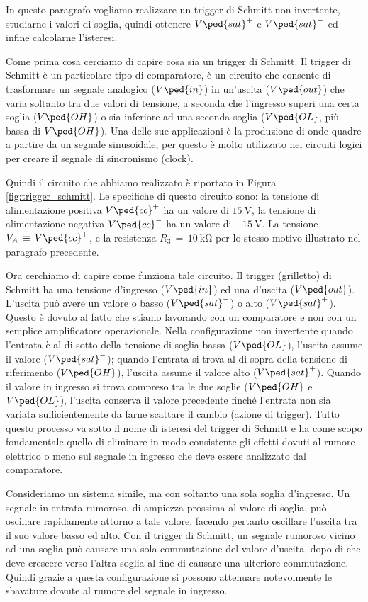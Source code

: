 In questo paragrafo vogliamo realizzare un trigger di Schmitt non invertente, studiarne i valori di soglia, quindi ottenere $V\ped{sat}^+$ e $V\ped{sat}^-$ ed infine calcolarne l'isteresi.

Come prima cosa cerciamo di capire cosa sia un trigger di Schmitt. Il trigger di Schmitt è un particolare tipo di comparatore, è un circuito che consente di trasformare un segnale analogico ($V\ped{in}$) in un'uscita ($V\ped{out}$) che varia soltanto tra due valori di tensione, a seconda che l'ingresso superi una certa soglia ($V\ped{OH}$) o sia inferiore ad una seconda soglia ($V\ped{OL}$, più bassa di $V\ped{OH}$). Una delle sue applicazioni è la produzione di onde quadre a partire da un segnale sinusoidale, per questo è molto utilizzato nei circuiti logici per creare il segnale di sincronismo (clock).

Quindi il circuito che abbiamo realizzato è riportato in Figura \ref{fig:trigger_schmitt}. Le specifiche di questo circuito sono: la tensione di alimentazione positiva $V\ped{cc}^+$ ha un valore di $\SI{+15}{\volt}$, la tensione di alimentazione negativa $V\ped{cc}^-$ ha un valore di $\SI{-15}{\volt}$. La tensione $V_A\,\equiv\,V\ped{cc}^+$, e la resistenza $R_3\,=\,\SI{10}{\kilo\ohm}$ per lo stesso motivo illustrato nel paragrafo precedente.

Ora cerchiamo di capire come funziona tale circuito. Il trigger (grilletto) di Schmitt ha una tensione d'ingresso ($V\ped{in}$) ed una d'uscita ($V\ped{out}$). L'uscita può avere un valore o basso ($V\ped{sat}^-$) o alto ($V\ped{sat}^+$). Questo è dovuto al fatto che stiamo lavorando con un comparatore e non con un semplice amplificatore operazionale.
Nella configurazione non invertente quando l'entrata è al di sotto della tensione di soglia bassa ($V\ped{OL}$), l'uscita assume il valore ($V\ped{sat}^-$); quando l'entrata si trova al di sopra della tensione di riferimento ($V\ped{OH}$), l'uscita assume il valore alto ($V\ped{sat}^+$). Quando il valore in ingresso si trova compreso tra le due soglie ($V\ped{OH}$ e $V\ped{OL}$), l'uscita conserva il valore precedente finché l'entrata non sia variata sufficientemente da farne scattare il cambio (azione di trigger). Tutto questo processo va sotto il nome di isteresi del trigger di Schmitt e ha come scopo fondamentale quello di eliminare in modo consistente gli effetti dovuti al rumore elettrico o meno sul segnale in ingresso che deve essere analizzato dal comparatore.

Consideriamo un sistema simile, ma con soltanto una sola soglia d'ingresso. Un segnale in entrata rumoroso, di ampiezza prossima al valore di soglia, può oscillare rapidamente attorno a tale valore, facendo pertanto oscillare l'uscita tra il suo valore basso ed alto. Con il trigger di Schmitt, un segnale rumoroso vicino ad una soglia può causare una sola commutazione del valore d'uscita, dopo di che deve crescere verso l'altra soglia al fine di causare una ulteriore commutazione. Quindi grazie a questa configurazione si possono attenuare notevolmente le sbavature dovute al rumore del segnale in ingresso.

